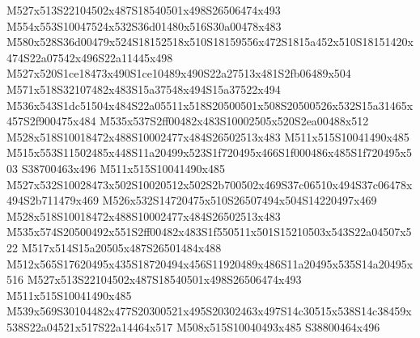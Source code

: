 \documentclass{article}
\begin{document}
\begin{multicols}{2}

M527x513S22104502x487S18540501x498S26506474x493 M554x553S10047524x532S36d01480x516S30a00478x483 M580x528S36d00479x524S18152518x510S18159556x472S1815a452x510S18151420x474S22a07542x496S22a11445x498 M527x520S1ce18473x490S1ce10489x490S22a27513x481S2fb06489x504 M571x518S32107482x483S15a37548x494S15a37522x494 M536x543S1dc51504x484S22a05511x518S20500501x508S20500526x532S15a31465x457S2f900475x484 M535x537S2ff00482x483S10002505x520S2ea00488x512 M528x518S10018472x488S10002477x484S26502513x483 M511x515S10041490x485 M515x553S11502485x448S11a20499x523S1f720495x466S1f000486x485S1f720495x503 S38700463x496 M511x515S10041490x485 M527x532S10028473x502S10020512x502S2b700502x469S37c06510x494S37c06478x494S2b711479x469 M526x532S14720475x510S26507494x504S14220497x469 M528x518S10018472x488S10002477x484S26502513x483 M535x574S20500492x551S2ff00482x483S1f550511x501S15210503x543S22a04507x522 M517x514S15a20505x487S26501484x488 M512x565S17620495x435S18720494x456S11920489x486S11a20495x535S14a20495x516 M527x513S22104502x487S18540501x498S26506474x493 M511x515S10041490x485 M539x569S30104482x477S20300521x495S20302463x497S14c30515x538S14c38459x538S22a04521x517S22a14464x517 M508x515S10040493x485 S38800464x496








\end{multicols}
\end{document}
